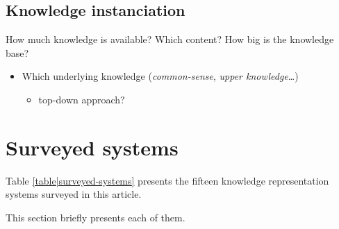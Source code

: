 \documentclass[a4paper, twocolumn]{article}
\begin{document}
\subsection{Knowledge instanciation}

How much knowledge is available? Which content? How big is the knowledge base?

\begin{itemize}
	\item  Which underlying knowledge (\emph{common-sense}, \emph{upper knowledge}\ldots{})
	\begin{itemize}
		\item  top-down approach?
	\end{itemize}

\end{itemize}



\section{Surveyed systems}
\label{sect|surveyed-systems}

Table \ref{table|surveyed-systems} presents the fifteen knowledge representation systems surveyed
in this article.

This section briefly presents each of them.
\end{document}
